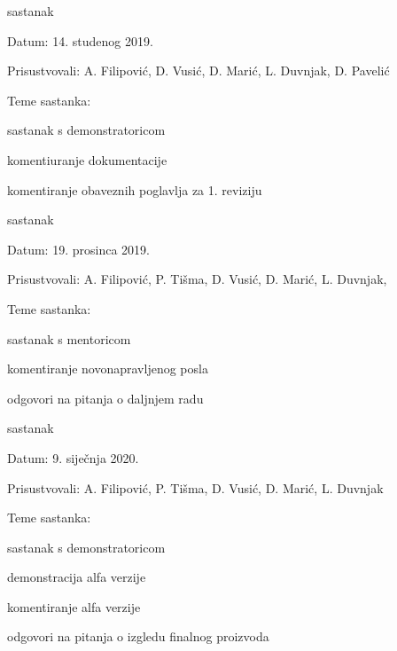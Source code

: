 \begin{packed_enum}
		\item  sastanak
		\item[] \begin{packed_item}
			\item Datum: 14. studenog 2019.
			\item Prisustvovali: A. Filipović, D. Vusić, D. Marić, L. Duvnjak, D. Pavelić
			\item Teme sastanka:
			\begin{packed_item}
				\item  sastanak s demonstratoricom
				\item  komentiuranje dokumentacije
				\item  komentiranje obaveznih poglavlja za 1. reviziju
			\end{packed_item}
		\end{packed_item}
	
			\item  sastanak
		\item[] \begin{packed_item}
			\item Datum: 19. prosinca 2019.
			\item Prisustvovali: A. Filipović, P. Tišma, D. Vusić, D. Marić, L. Duvnjak, 
			\item Teme sastanka:
			\begin{packed_item}
				\item  sastanak s mentoricom
				\item  komentiranje novonapravljenog posla
				\item  odgovori na pitanja o daljnjem radu
			\end{packed_item}
		\end{packed_item}
	
		\item  sastanak
	\item[] \begin{packed_item}
		\item Datum: 9. siječnja 2020.
		\item Prisustvovali: A. Filipović, P. Tišma, D. Vusić, D. Marić, L. Duvnjak
		\item Teme sastanka:
		\begin{packed_item}
			\item  sastanak s demonstratoricom
			\item  demonstracija alfa verzije 
			\item  komentiranje alfa verzije
			\item odgovori na pitanja o izgledu finalnog proizvoda
		\end{packed_item}
	\end{packed_item}


\end{packed_enum}
